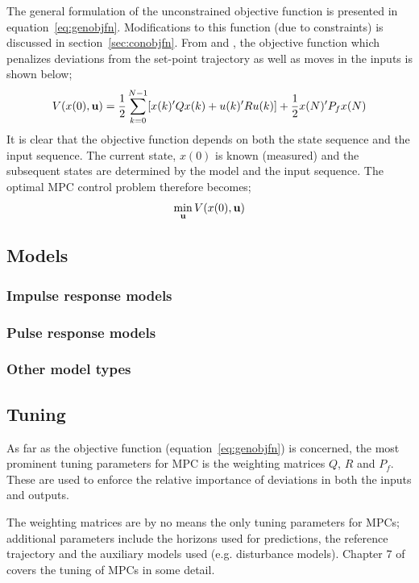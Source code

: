 The general formulation of the unconstrained objective function is presented in equation~\ref{eq:genobjfn}. 
Modifications to this function (due to constraints) is discussed in section~\ref{sec:conobjfn}. 
From \citet[17]{rawlings} and \citet[41]{maciejowskimpc}, the objective function which penalizes deviations from the set-point trajectory as well as moves in the inputs is shown below;
\begin{equation}
  \label{eq:genobjfn}
  V(x(0),{\bf u})=\frac{1}{2}\sum^{N-1}_{k=0}[x(k)'Qx(k)+u(k)'Ru(k)]
  + \frac{1}{2}x(N)'P_fx(N)
\end{equation}
It is clear that the objective function depends on both the state sequence and the input sequence. 
The current state, $x(0)$ is known (measured) and the subsequent states are determined by the model and the input sequence. 
The optimal MPC control problem therefore becomes;
\begin{equation}
  \label{eq:opctrlprob}
  \min_{\bf u} V(x(0),{\bf u})
\end{equation}
\subsection{Models}
\subsubsection{Impulse response models}
\subsubsection{Pulse response models}
\subsubsection{Other model types}
\subsection{Tuning}
As far as the objective function (equation~\ref{eq:genobjfn}) is concerned, the most prominent tuning parameters for MPC is the weighting matrices $Q$, $R$ and $P_f$. 
These are used to enforce the relative importance of deviations in both the inputs and outputs.

The weighting matrices are by no means the only tuning parameters for MPCs; additional parameters include the horizons used for predictions, the reference trajectory and the auxiliary models used (e.g. disturbance models). 
Chapter 7 of \citet{maciejowskimpc} covers the tuning of MPCs in some detail.

